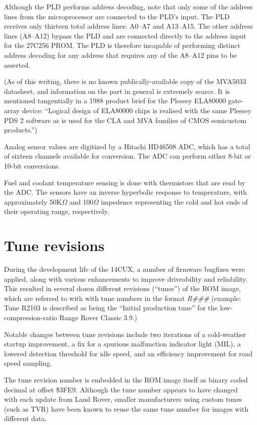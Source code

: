 \documentclass[11pt,twocolumn]{scrartcl}
\begin{document}
Although the PLD performs address decoding, note that only some of the address lines from the microprocessor are connected to the PLD's input. The PLD receives only thirteen total address lines: A0--A7 and A13--A15. The other address lines (A8--A12) bypass the PLD and are connected directly to the address input for the 27C256 PROM. The PLD is therefore incapable of performing distinct address decoding for any address that requires any of the A8--A12 pins to be asserted.

(As of this writing, there is no known publically-available copy of the MVA5033 datasheet, and information on the part in general is extremely scarce. It is mentioned tangentially in a 1988 product brief for the Plessey ELA80000 gate-array device: ``Logical design of ELA80000 chips is realised with the same Plessey PDS 2 software as is used for the CLA and MVA families of CMOS semicustom products.'')

Analog sensor values are digitized by a Hitachi HD46508 ADC, which has a total of sixteen channels available for conversion. The ADC can perform either 8-bit or 10-bit conversions.

Fuel and coolant temperature sensing is done with thermistors that are read by the ADC. The sensors have an inverse hyperbolic response to temperature, with approximately 50K$\Omega$ and 100$\Omega$ impedence representing the cold and hot ends of their operating range, respectively.

\section {Tune revisions}
During the development life of the 14CUX, a number of firmware bugfixes were applied, along with various enhancements to improve driveability and reliability. This resulted in several dozen different revisions (``tunes'') of the ROM image, which are referred to with with tune numbers in the format {\em R\#\#\#} (example: Tune R2103 is described as being the ``Initial production tune'' for the low-compression-ratio Range Rover Classic 3.9.)

Notable changes between tune revisions include two iterations of a cold-weather startup improvement, a fix for a spurious malfunction indicator light (MIL), a lowered detection threshold for idle speed, and an efficiency improvement for road speed sampling.

The tune revision number is embedded in the ROM image itself as binary coded decimal at offset \$3FE9. Although the tune number appears to have changed with each update from Land Rover, smaller manufacturers using custom tunes (such as TVR) have been known to reuse the same tune number for images with different data.
\end{document}
